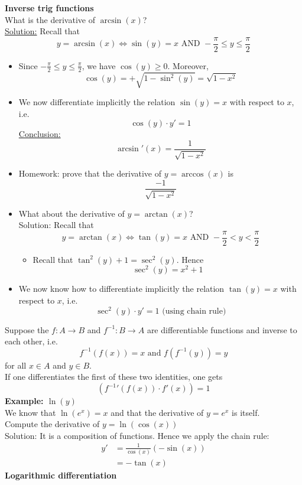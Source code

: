 \documentclass[]{article}
\begin{document}
	\large{\bf Inverse trig functions}\\
	\normalsize
	What is the derivative of $\arcsin(x)$?\\
	\underline{Solution:} Recall that
	$$
		y=\arcsin(x)\iff\sin(y)=x\text{ AND }-\frac{\pi}{2}\le y\le\frac{\pi}{2}
	$$
	\begin{itemize}
		\item Since $-\frac{\pi}{2}\le y\le\frac{\pi}{2}$, we have $\cos(y)\ge 0$. Moreover,
		$$
			\cos(y)=+\sqrt{1-\sin^2(y)}=\sqrt{1-x^2}
		$$
		\item We now differentiate implicitly the relation $\sin(y)=x$ with respect to  $x$, i.e.
		$$
			\cos(y)\cdot y'=1
		$$
		\underline{Conclusion:}
		$$
			\arcsin'(x)=\frac{1}{\sqrt{1-x^2}}
		$$
		\item Homework: prove that the derivative of $y=\arccos(x)$ is
		$$
			\frac{-1}{\sqrt{1-x^2}}
		$$
		\item What about the derivative of $y=\arctan(x)$?\\
		Solution: Recall that
		$$
			y=\arctan(x)\iff\tan(y)=x\text{ AND }-\frac{\pi}{2}<y<\frac{\pi}{2}
		$$
		\begin{itemize}
			\item Recall that $\tan^2(y)+1=\sec^2(y)$. Hence
			$$
				\sec^2(y)=x^2+1
			$$
		\end{itemize}
		\item We now know how  to differentiate implicitly the relation $\tan(y)=x$ with respect to $x$, i.e.
		$$
			\sec^2(y)\cdot y'=1\text{ (using chain rule)}
		$$
	\end{itemize}
	Suppose the $f:A\rightarrow B$ and $f^{-1}:B\rightarrow A$ are differentiable functions and inverse to each other, i.e.
	$$
		f^{-1}(f(x))=x\text{ and }f(f^{-1}(y))=y
	$$
	for all $x\in A$ and $y\in B$.\\
	If one differentiates the first of these two identities, one gets
	$$
		(f^{-1}\prime(f(x))\cdot f'(x))=1
	$$
	{\bf Example: $\ln(y)$}\\
	We know that $\ln(e^x)=x$ and that the derivative of $y=e^x$ is itself.\\
	Compute the derivative of $y=\ln(\cos(x))$\\
	Solution: It is a composition of functions. Hence we apply the chain rule:
	\begin{align*}
		y'&=\frac{1}{\cos(x)}(-\sin(x))\\
		&=-\tan(x)
	\end{align*}
	\pagebreak
	\large{\bf Logarithmic differentiation}\\
\end{document}
